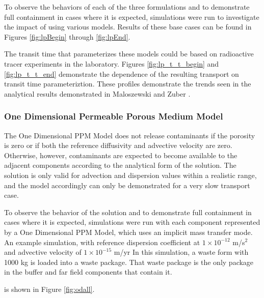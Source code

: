 To observe the behaviors of each of the three formulations and to demonstrate 
full containment in cases where it is expected, simulations were run to 
investigate the impact of using various models. Results of these base cases can be found in Figures 
\ref{fig:lpBegin} through \ref{fig:lpEnd}.



The transit time that parameterizes these models could be based on radioactive 
tracer experiments in the laboratory. Figures \ref{fig:lp_t_t_begin} 
and \ref{fig:lp_t_t_end} demonstrate the dependence of the resulting transport on 
transit time parameteriztion. These profiles demonstrate the trends seen in the 
analytical results demonstrated in Maloszewski and Zuber 
\cite{maloszewski_lumped_1996}.



\subsubsection{One Dimensional Permeable Porous Medium Model}
The One Dimensional PPM Model does not release contaminants if the porosity is 
zero or if both the reference diffusivity and advective velocity are zero. 
Otherwise, however, contaminants are expected to  become available to the adjacent 
components according to the analytical form of the solution. The solution is 
only valid for advection and dispersion values within a realistic range, and 
the model accordingly can only be demonstrated for a very slow transport case. 

To observe the behavior of the solution and to demonstrate full containment in 
cases where it is expected, simulations were run with each component represented 
by a One Dimensional PPM Model, which uses an implicit mass transfer mode. An 
example simulation, with reference dispersion coefficient at $1\times 10^{-12}$ 
m/s$^2$ and advective velocity of $1\times 10^{-15}$ m/yr 
In this simulation, a waste form with 1000 kg 
is loaded into a waste package. That waste package is the only package in the 
buffer and far field components that contain it.


\FloatBarrier
is shown in Figure \ref{fig:odall}. 
